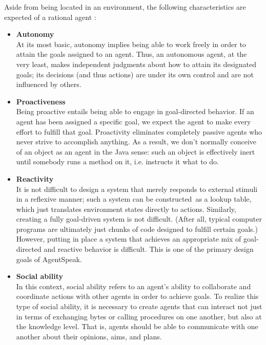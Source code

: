 \vspace{.5cm}

Aside from being located in an environment, the following characteristics are expected of a rational agent \cite{charAgent}:

\vspace{.5cm}

\begin{itemize}
    \item \textbf{Autonomy}\\
    
    At its most basic, autonomy implies being able to work freely in order to attain the goals assigned to an agent. Thus, an autonomous agent, at the very least, makes independent judgments about how to attain its designated goals; its decisions (and thus actions) are under its own control and are not influenced by others.

    \vspace{.5cm}
    
    \item \textbf{Proactiveness}\\
    Being proactive entails being able to engage in goal-directed behavior. If an agent has been assigned a specific goal, we expect the agent to make every effort to fulfill that goal. Proactivity eliminates completely passive agents who never strive to accomplish anything. As a result, we don't normally conceive of an object as an agent in the Java sense: such an object is effectively inert until somebody runs a method on it, i.e. instructs it what to do.

    \vspace{.5cm}
    
    \item \textbf{Reactivity}\\
    It is not difficult to design a system that merely responds to external stimuli in a reflexive manner; such a system can be constructed as a lookup table, which just translates environment states directly to actions. Similarly, creating a fully goal-driven system is not difficult. (After all, typical computer programs are ultimately just chunks of code designed to fulfill certain goals.) However, putting in place a system that achieves an appropriate mix of goal-directed and reactive behavior is difficult. This is one of the primary design goals of AgentSpeak.

    \vspace{.5cm}
    
    \item \textbf{Social ability}\\
    In this context, social ability refers to an agent's ability to collaborate and coordinate actions with other agents in order to achieve goals. To realize this type of social ability, it is necessary to create agents that can interact not just in terms of exchanging bytes or calling procedures on one another, but also at the knowledge level. That is, agents should be able to communicate with one another about their opinions, aims, and plans.
    
    \vspace{.5cm}
    
\end{itemize}

